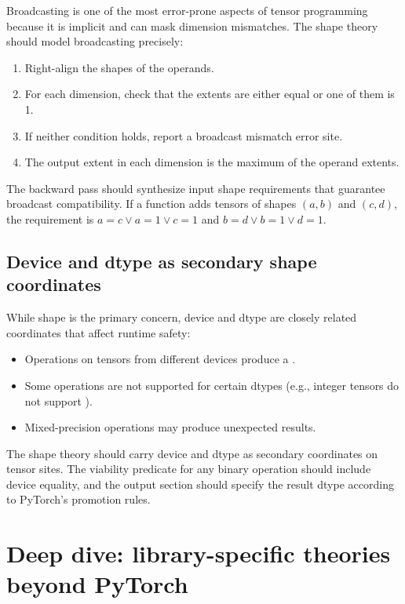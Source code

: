 \documentclass[11pt]{report}
\DeclareRobustCommand{\py}[1]{\texttt{\detokenize{#1}}}
\theoremstyle{definition}
\theoremstyle{plain}
\begin{document}
Broadcasting is one of the most error-prone aspects of tensor programming
because it is implicit and can mask dimension mismatches. The shape theory
should model broadcasting precisely:
\begin{enumerate}[nosep]
  \item Right-align the shapes of the operands.
  \item For each dimension, check that the extents are either equal or one
        of them is 1.
  \item If neither condition holds, report a broadcast mismatch error site.
  \item The output extent in each dimension is the maximum of the operand
        extents.
\end{enumerate}

The backward pass should synthesize input shape requirements that guarantee
broadcast compatibility. If a function adds tensors of shapes $(a, b)$ and
$(c, d)$, the requirement is $a = c \lor a = 1 \lor c = 1$ and
$b = d \lor b = 1 \lor d = 1$.

\subsection{Device and dtype as secondary shape coordinates}

While shape is the primary concern, device and dtype are closely related
coordinates that affect runtime safety:
\begin{itemize}[nosep]
  \item Operations on tensors from different devices produce a
        \py{RuntimeError}.
  \item Some operations are not supported for certain dtypes (e.g., integer
        tensors do not support \py{torch.sin}).
  \item Mixed-precision operations may produce unexpected results.
\end{itemize}

The shape theory should carry device and dtype as secondary coordinates on
tensor sites. The viability predicate for any binary operation should include
device equality, and the output section should specify the result dtype
according to PyTorch's promotion rules.

\section{Deep dive: library-specific theories beyond PyTorch}
\end{document}
